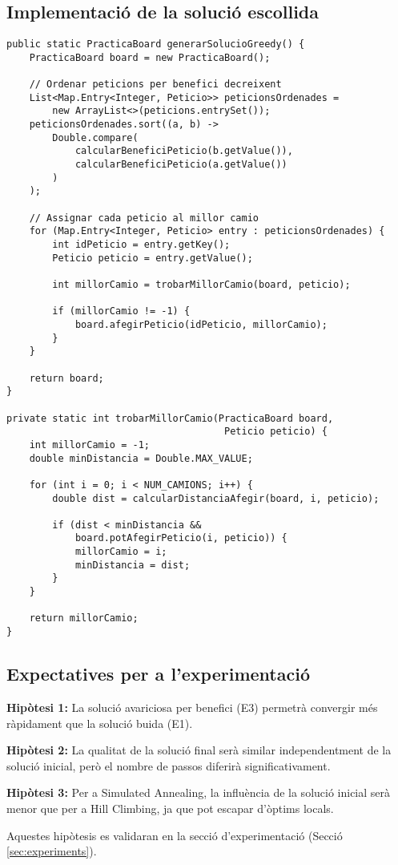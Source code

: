 \subsection{Implementació de la solució escollida}

\begin{lstlisting}[caption={Implementació de la solució avariciosa per benefici}, label={lst:greedy-impl}]
public static PracticaBoard generarSolucioGreedy() {
    PracticaBoard board = new PracticaBoard();
    
    // Ordenar peticions per benefici decreixent
    List<Map.Entry<Integer, Peticio>> peticionsOrdenades = 
        new ArrayList<>(peticions.entrySet());
    peticionsOrdenades.sort((a, b) -> 
        Double.compare(
            calcularBeneficiPeticio(b.getValue()),
            calcularBeneficiPeticio(a.getValue())
        )
    );
    
    // Assignar cada peticio al millor camio
    for (Map.Entry<Integer, Peticio> entry : peticionsOrdenades) {
        int idPeticio = entry.getKey();
        Peticio peticio = entry.getValue();
        
        int millorCamio = trobarMillorCamio(board, peticio);
        
        if (millorCamio != -1) {
            board.afegirPeticio(idPeticio, millorCamio);
        }
    }
    
    return board;
}

private static int trobarMillorCamio(PracticaBoard board, 
                                      Peticio peticio) {
    int millorCamio = -1;
    double minDistancia = Double.MAX_VALUE;
    
    for (int i = 0; i < NUM_CAMIONS; i++) {
        double dist = calcularDistanciaAfegir(board, i, peticio);
        
        if (dist < minDistancia && 
            board.potAfegirPeticio(i, peticio)) {
            millorCamio = i;
            minDistancia = dist;
        }
    }
    
    return millorCamio;
}
\end{lstlisting}

\subsection{Expectatives per a l'experimentació}

\textbf{Hipòtesi 1:} La solució avariciosa per benefici (E3) permetrà convergir més ràpidament que la solució buida (E1).

\textbf{Hipòtesi 2:} La qualitat de la solució final serà similar independentment de la solució inicial, però el nombre de passos diferirà significativament.

\textbf{Hipòtesi 3:} Per a Simulated Annealing, la influència de la solució inicial serà menor que per a Hill Climbing, ja que pot escapar d'òptims locals.

Aquestes hipòtesis es validaran en la secció d'experimentació (Secció \ref{sec:experiments}).